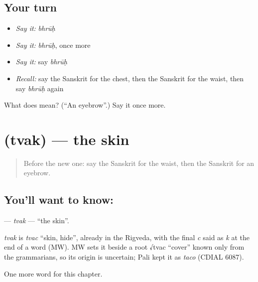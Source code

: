 \subsection*{Your turn}
\begin{itemize}
\raggedright
  \item \emph{Say it:} \emph{bhrūḥ}
  \item \emph{Say it:} \emph{bhrūḥ}, once more
  \item \emph{Say it:} say \emph{bhrūḥ}
  \item \emph{Recall:} say the Sanskrit for the chest, then the Sanskrit for the waist, then say \emph{bhrūḥ} again
\end{itemize}

\begin{tcolorbox}[breakable,colback=teal!4,colframe=teal!35!black,title={Before you move on}]
What does  mean? (\textquotedblleft{}An eyebrow\textquotedblright{}.) Say it once more.
\end{tcolorbox}
\section[\texorpdfstring{\sk{त्वक्} (tvak)}{त्वक् (tvak)}]{ (tvak) — the skin}

\label{lesson:SA-C117-tvak}



\begin{quote}
Before the new one: say the Sanskrit for the waist, then the Sanskrit for an eyebrow.
\end{quote}

\subsection*{You'll want to know: }
\textbf{} — \emph{tvak} — \textquotedblleft{}the skin\textquotedblright{}.

\begin{cousinweb}
\emph{tvak} is \emph{tvac} \textquotedblleft{}skin, hide\textquotedblright{}, already in the Rigveda, with the final \emph{c} said as \emph{k} at the end of a word (MW). MW sets it beside a root √tvac \textquotedblleft{}cover\textquotedblright{} known only from the grammarians, so its origin is uncertain; Pali kept it as \emph{taco} (CDIAL 6087).
\end{cousinweb}

\begin{grammarlens}[title={What you've built}]
One more word for this chapter.
\end{grammarlens}

